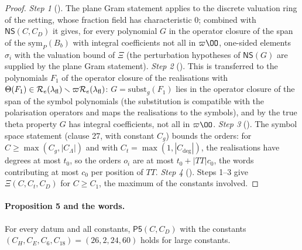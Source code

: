 \begin{proof}
\emph{Step 1} (). The plane Gram statement applies to the
discrete valuation ring of the setting, whose fraction field has characteristic $0$; combined with $\mathsf{NS}(C,C_D)$ it gives,
for every polynomial $G$ in the operator closure of the span of the $\mathrm{sym}_P(B_b)$ with integral coefficients not all in
$\varpi\OO$, one-sided elements $\sigma_i$ with the valuation bound of $\Xi$ (the perturbation hypotheses of $\mathsf{NS}(G)$ are
supplied by the plane Gram statement). \emph{Step 2} (). This is transferred to the polynomials $F_1$
of the operator closure of the realisations with $\Theta(F_1)\in\mathcal R_e(\lambda_{\mathrm{fl}})\smallsetminus\varpi\mathcal R_e(\lambda_{\mathrm{fl}})$:
$G=\mathrm{subst}_g(F_1)$ lies in the operator closure of the span of the symbol polynomials (the substitution is compatible
with the polarisation operators and maps the realisations to the symbols), and by the true theta property $G$ has integral
coefficients, not all in $\varpi\OO$. \emph{Step 3} (). The symbol space
statement (clause 27, with constant $C_g$) bounds the orders: for $C\ge\max(C_g,|C_\Lambda|)$ and with
$C_t=\max(1,|C_{\deg}|)$, the realisations have degrees at most $t_0$, so the orders $o_i$ are at most $t_0+|TT|c_0$, the
words contributing at most $c_0$ per position of $TT$. \emph{Step 4}
(). Steps 1--3 give $\Xi(C,C_t,C_D)$ for $C\ge C_1$, the maximum
of the constants involved.
\end{proof}

\paragraph{Proposition 5 and the words.}

\begin{proposition}[Proposition 5]\label{pf:linkG:prop5}
For every datum and all constants, $\mathsf{P5}(C,C_D)$ with the constants $(C_H,C_E,C_6,C_{18})=(26,2,24,60)$ holds for large
constants.
\end{proposition}

